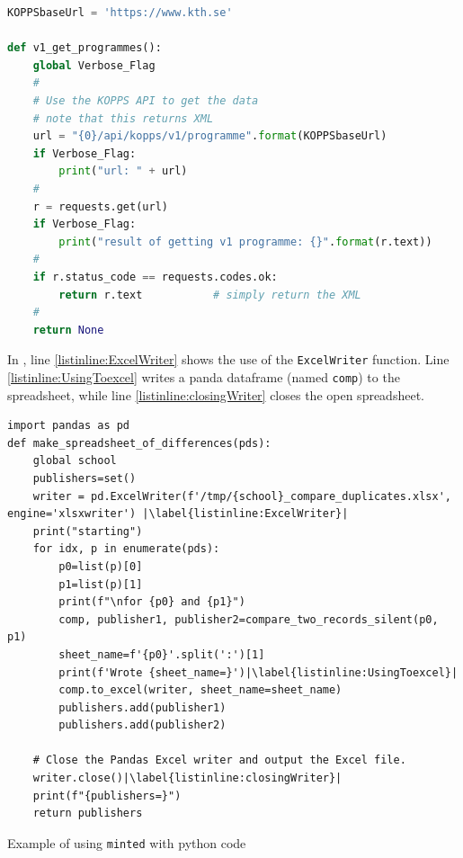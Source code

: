 \documentclass[nomenclature, english, biblatex]{kththesis}
\numberwithin{listing}{chapter}
\begin{document}
\lstset{extendedchars=true}  %
\begin{lstlisting}[language={Python}, caption={Using a python program to
    access the KTH API to get all of the programs at KTH}, label=lst:programmes]
KOPPSbaseUrl = 'https://www.kth.se'

def v1_get_programmes():
    global Verbose_Flag
    #
    # Use the KOPPS API to get the data
    # note that this returns XML
    url = "{0}/api/kopps/v1/programme".format(KOPPSbaseUrl)
    if Verbose_Flag:
        print("url: " + url)
    #
    r = requests.get(url)
    if Verbose_Flag:
        print("result of getting v1 programme: {}".format(r.text))
    #
    if r.status_code == requests.codes.ok:
        return r.text           # simply return the XML
    #
    return None
\end{lstlisting}
\FloatBarrier

In , line \ref{listinline:ExcelWriter} shows the use of the \texttt{ExcelWriter} function. Line \ref{listinline:UsingToexcel} writes a panda dataframe (named \texttt{comp}) to the spreadsheet, while line \ref{listinline:closingWriter} closes the open spreadsheet.

\begin{listing}[!ht]
\begin{verbatim}
import pandas as pd
def make_spreadsheet_of_differences(pds):
    global school
    publishers=set()
    writer = pd.ExcelWriter(f'/tmp/{school}_compare_duplicates.xlsx', engine='xlsxwriter') |\label{listinline:ExcelWriter}|
    print("starting")
    for idx, p in enumerate(pds):
        p0=list(p)[0]
        p1=list(p)[1]
        print(f"\nfor {p0} and {p1}")
        comp, publisher1, publisher2=compare_two_records_silent(p0, p1)
        sheet_name=f'{p0}'.split(':')[1]
        print(f'Wrote {sheet_name=}')|\label{listinline:UsingToexcel}|
        comp.to_excel(writer, sheet_name=sheet_name)
        publishers.add(publisher1)
        publishers.add(publisher2)
    
    # Close the Pandas Excel writer and output the Excel file.
    writer.close()|\label{listinline:closingWriter}|
    print(f"{publishers=}")
    return publishers
\end{verbatim}
\caption{Example of using \texttt{minted} with python code}
\label{lst:exampleUsingMinted}
\end{listing}

\FloatBarrier
\end{document}
